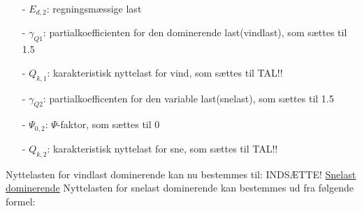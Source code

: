 \begin{itemize}
	\item[-] $E_{d,2}$: regningsmæssige last
	\item[-] $\gamma_{Q1}$: partialkoefficienten for den dominerende last(vindlast), som sættes til 1.5 \citep[ tabel A 1.2(B+C) anneks A.1.3.1]{EU90}
	\item[-] $Q_{k,1}$: karakteristisk nyttelast for vind, som sættes til TAL!!
	\item[-] $\gamma_{Q2}$: partialkoefficenten for den variable last(snelast), som sættes til 1.5 \citep[ tabel A 1.2(B+C) anneks A.1.3.1]{EU90}
	\item[-] $\Psi_{0,2}$: $\Psi$-faktor, som sættes til 0 \citep[ tabel A 1.1 anneks A.1.2.2]{EU90}
	\item[-] $Q_{k,2}$: karakteristisk nyttelast for sne, som sættes til TAL!!
\end{itemize}
Nyttelasten for vindlast dominerende kan nu bestemmes til:
\newline
\newline
INDSÆTTE!
\newline
\newline
\underline{Snelast dominerende}
Nyttelasten for snelast dominerende kan bestemmes ud fra følgende formel: 
